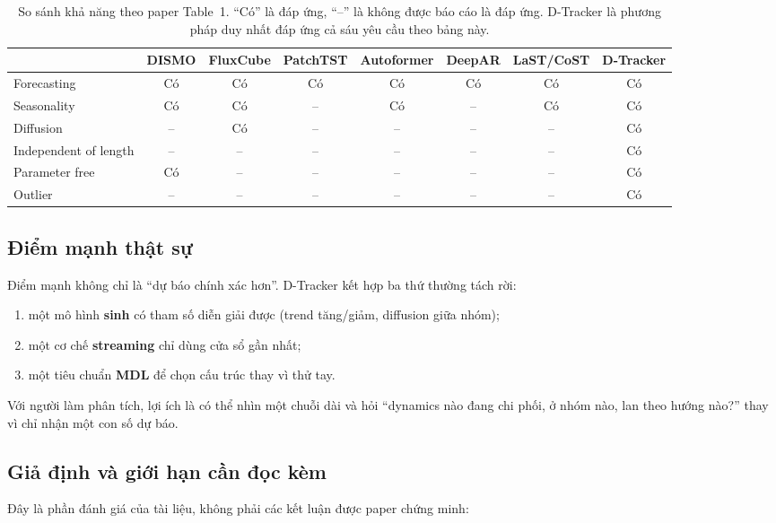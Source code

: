 \begin{table}[htbp]
  \centering
  \scriptsize
  \caption{So sánh khả năng theo paper Table~1. ``Có'' là đáp ứng, ``--'' là không được báo cáo
  là đáp ứng. D-Tracker là phương pháp duy nhất đáp ứng cả sáu yêu cầu theo bảng này.}
  \label{tab:capabilities}
  \begin{tabular}{@{}lccccccc@{}}
    \toprule
    & DISMO & FluxCube & PatchTST & Autoformer & DeepAR & LaST/CoST & D-Tracker \\
    \midrule
    Forecasting & Có & Có & Có & Có & Có & Có & Có \\
    Seasonality & Có & Có & -- & Có & -- & Có & Có \\
    Diffusion & -- & Có & -- & -- & -- & -- & Có \\
    Independent of length & -- & -- & -- & -- & -- & -- & Có \\
    Parameter free & Có & -- & -- & -- & -- & -- & Có \\
    Outlier & -- & -- & -- & -- & -- & -- & Có \\
    \bottomrule
  \end{tabular}
\end{table}

\subsection{Điểm mạnh thật sự}

Điểm mạnh không chỉ là ``dự báo chính xác hơn''. D-Tracker kết hợp ba thứ thường tách rời:
\begin{enumerate}
  \item một mô hình \textbf{sinh} có tham số diễn giải được (trend tăng/giảm, diffusion giữa nhóm);
  \item một cơ chế \textbf{streaming} chỉ dùng cửa sổ gần nhất;
  \item một tiêu chuẩn \textbf{MDL} để chọn cấu trúc thay vì thử tay.
\end{enumerate}
Với người làm phân tích, lợi ích là có thể nhìn một chuỗi dài và hỏi ``dynamics nào đang chi phối,
ở nhóm nào, lan theo hướng nào?'' thay vì chỉ nhận một con số dự báo.

\subsection{Giả định và giới hạn cần đọc kèm}

Đây là phần đánh giá của tài liệu, không phải các kết luận được paper chứng minh:

